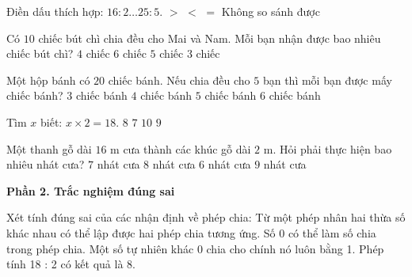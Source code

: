 \begin{ex} %
Điền dấu thích hợp: $16 : 2 \dots 25 : 5$.
\choice
{\True $>$}
{$<$}
{$=$}
{Không so sánh được}
\end{ex}

\begin{ex} %
Có $10$ chiếc bút chì chia đều cho Mai và Nam. Mỗi bạn nhận được bao nhiêu chiếc bút chì?
\choice
{$4$ chiếc}
{$6$ chiếc}
{\True $5$ chiếc}
{$3$ chiếc}
\end{ex}

\begin{ex} %
Một hộp bánh có $20$ chiếc bánh. Nếu chia đều cho $5$ bạn thì mỗi bạn được mấy chiếc bánh?
\choice
{$3$ chiếc bánh}
{\True $4$ chiếc bánh}
{$5$ chiếc bánh}
{$6$ chiếc bánh}
\end{ex}

\begin{ex} %
Tìm $x$ biết: $x \times 2 = 18$.
\choice
{$8$}
{$7$}
{$10$}
{\True $9$}
\end{ex}

\begin{ex} %
Một thanh gỗ dài $16\text{ m}$ cưa thành các khúc gỗ dài $2\text{ m}$. Hỏi phải thực hiện bao nhiêu nhát cưa?
\choice
{\True $7$ nhát cưa}
{$8$ nhát cưa}
{$6$ nhát cưa}
{$9$ nhát cưa}
\end{ex}

\textbf{Phần 2. Trắc nghiệm đúng sai}

\begin{ex} %
Xét tính đúng sai của các nhận định về phép chia:
\choiceTF
{\True Từ một phép nhân hai thừa số khác nhau có thể lập được hai phép chia tương ứng.}
{Số 0 có thể làm số chia trong phép chia.}
{\True Một số tự nhiên khác 0 chia cho chính nó luôn bằng 1.}
{Phép tính 18 : 2 có kết quả là 8.}
\end{ex}

